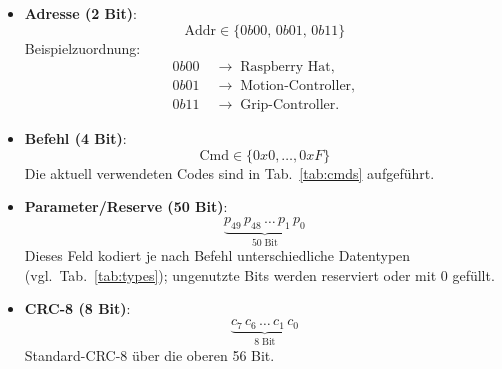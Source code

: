 \documentclass[main.tex]{subfiles} %
\begin{document}
\begin{itemize}
  \item \textbf{Adresse (2 Bit)}:
        \[
          \text{Addr} \in \{0b00,\,0b01,\,0b11\}
        \]
        Beispielzuordnung:
        \begin{align*}
          0b00 & \;\rightarrow\; \text{Raspberry Hat},     \\
          0b01 & \;\rightarrow\; \text{Motion-Controller}, \\
          0b11 & \;\rightarrow\; \text{Grip-Controller}.
        \end{align*}

  \item \textbf{Befehl (4 Bit)}:
        \[
          \text{Cmd} \in \{0x0,\dots,0xF\}
        \]
        Die aktuell verwendeten Codes sind in Tab.~\ref{tab:cmds} aufgeführt.

  \item \textbf{Parameter/Reserve (50 Bit)}:
        \[
          \underbrace{p_{49}\,p_{48}\,\dots\,p_{1}\,p_{0}}_{50\;\text{Bit}}
        \]
        Dieses Feld kodiert je nach Befehl unterschiedliche Datentypen (vgl.\
        Tab.~\ref{tab:types}); ungenutzte Bits werden reserviert oder mit 0 gefüllt.

  \item \textbf{CRC-8 (8 Bit)}:
        \[
          \underbrace{c_{7}\,c_{6}\,\dots\,c_{1}\,c_{0}}_{8\;\text{Bit}}
        \]
        Standard-CRC-8 über die oberen 56 Bit.
\end{itemize}

\newpage
\end{document}
